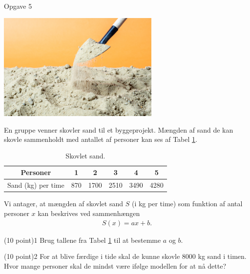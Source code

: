 \begin{opgavetekst}{Opgave 5}
	\begin{center}
	\includegraphics[width= 0.6\textwidth]{Billeder/sand.jpg}
	\end{center}
	En gruppe venner skovler sand til et byggeprojekt. Mængden af sand de kan skovle sammenholdt med antallet af personer kan ses af Tabel \ref{tab:sand}.
	
	\begin{table}[H]
		\centering
		\begin{tabular}{c|c|c|c|c|c}
		Personer & 1 & 2 & 3 & 4 & 5 \\
		\hline
		Sand (kg) per time  & 870 & 1700 & 2510 & 3490 & 4280	
		\end{tabular}
		\caption{Skovlet sand.}
		\label{tab:sand}
	\end{table}
	Vi antager, at mængden af skovlet sand $S$ (i kg per time) som funktion af antal personer $x$ kan beskrives ved sammenhængen
	\begin{align*}
		S(x) = ax+b.
	\end{align*}
\end{opgavetekst}
\begin{delopgave}{(10 point)}{1}
	Brug tallene fra Tabel \ref{tab:sand} til at bestemme $a$ og $b$. 
\end{delopgave}
\begin{delopgave}{(10 point)}{2}
	For at blive færdige i tide skal de kunne skovle 8000 kg sand i timen. Hvor mange personer skal de mindst være ifølge modellen for at nå dette?
\end{delopgave}


